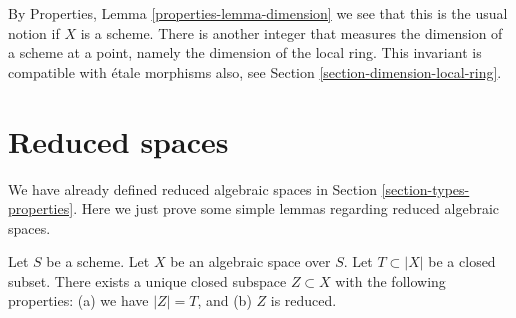 \noindent
By
Properties, Lemma \ref{properties-lemma-dimension}
we see that this is the usual notion if $X$ is a scheme.
There is another integer that measures the dimension of a scheme
at a point, namely the dimension of the local ring. This invariant
is compatible with \'etale morphisms also, see
Section \ref{section-dimension-local-ring}.





\section{Reduced spaces}
\label{section-reduced}

\noindent
We have already defined reduced algebraic spaces in
Section \ref{section-types-properties}.
Here we just prove some simple lemmas regarding reduced algebraic
spaces.

\begin{lemma}
\label{lemma-reduced-closed-subspace}
Let $S$ be a scheme.
Let $X$ be an algebraic space over $S$.
Let $T \subset |X|$ be a closed subset.
There exists a unique closed subspace $Z \subset X$ with
the following properties: (a) we have $|Z| = T$, and (b) $Z$ is reduced.
\end{lemma}

